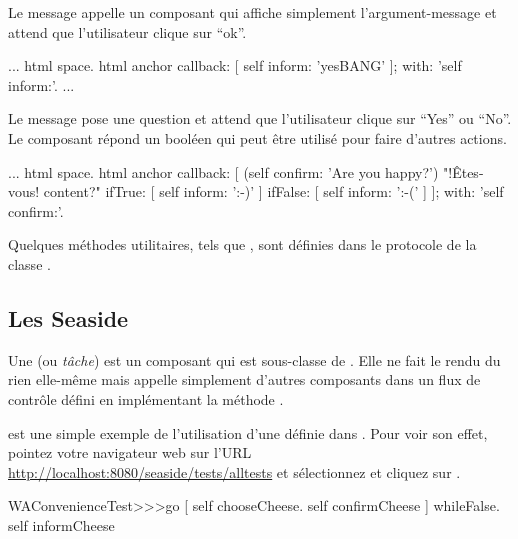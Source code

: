 \documentclass[a4paper,10pt,twoside]{book}
\begin{document}
Le message  appelle un composant qui
affiche simplement l'argument-message et attend que l'utilisateur
clique sur ``ok''.

\begin{code}{}
...
	html space.
	html anchor
		callback: [ self inform: 'yesBANG' ];
		with: 'self inform:'.
...
\end{code}

Le message  pose une question et attend
que l'utilisateur clique sur ``Yes'' ou ``No''.
Le composant répond un booléen qui peut être utilisé pour faire
d'autres actions.

\begin{code}{}
...
	html space.
	html anchor
		callback: [
			(self confirm: 'Are you happy?') "!Êtes-vous! content?"
				ifTrue: [ self inform: ':-)' ]
				ifFalse: [ self inform: ':-(' ]
			];
		with: 'self confirm:'.
\end{code}

Quelques méthodes utilitaires, tels que
, sont définies dans le
protocole  de la classe .

\subsection{Les \tasks Seaside}

Une  (ou \emph{tâche}) est un composant qui est
sous-classe de .
Elle ne fait le rendu du rien elle-même mais appelle simplement
d'autres composants dans un flux de contrôle défini en implémentant la
méthode .


 est une simple exemple de l'utilisation
d'une \task définie dans . %
Pour voir son effet, pointez votre navigateur web sur l'URL
\url{http://localhost:8080/seaside/tests/alltests} et sélectionnez
 et cliquez sur .

\begin{code}{}
WAConvenienceTest>>>go
	[ self chooseCheese.
	  self confirmCheese ] whileFalse.
	self informCheese
\end{code}
\end{document}
